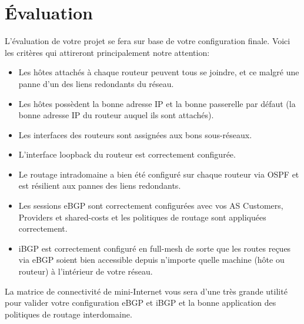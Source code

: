 \documentclass[a4paper, 11pt]{article}
\begin{document}
\section{Évaluation}

L'évaluation de votre projet se fera sur base de votre configuration finale.
Voici les critères qui attireront principalement notre attention:

\begin{itemize}
    \item Les hôtes attachés à chaque routeur peuvent tous se joindre,
          et ce malgré une panne d'un des liens redondants du réseau.
    \item Les hôtes possèdent la bonne adresse IP et la bonne passerelle par
          défaut (la bonne adresse IP du routeur auquel ils sont attachés).
    \item Les interfaces des routeurs sont assignées aux bons sous-réseaux.
    \item L'interface loopback du routeur est correctement configurée.
    \item Le routage intradomaine a bien été configuré sur chaque routeur
          via OSPF et est résilient aux pannes des liens redondants.
    \item Les sessions eBGP sont correctement configurées avec vos AS Customers,
          Providers et shared-costs et les politiques de routage sont 
          appliquées correctement.
    \item iBGP est correctement configuré en full-mesh de sorte que les routes
          reçues via eBGP soient bien accessible depuis n'importe quelle machine
          (hôte ou routeur) à l'intérieur de votre réseau. 
\end{itemize}

La matrice de connectivité de mini-Internet vous sera d'une très grande utilité
pour valider votre configuration eBGP et iBGP et la bonne application des
politiques de routage interdomaine.


\end{document}
